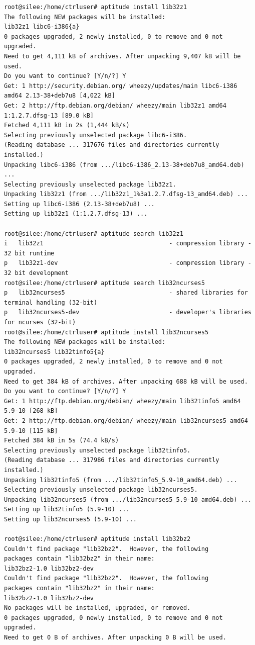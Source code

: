 \documentclass[11pt
  , a4paper
  , article
  , oneside
]{memoir}
\begin{document}
\begin{lstlisting}[style=termstyle]
root@silee:/home/ctrluser# aptitude install lib32z1
The following NEW packages will be installed:
lib32z1 libc6-i386{a} 
0 packages upgraded, 2 newly installed, 0 to remove and 0 not upgraded.
Need to get 4,111 kB of archives. After unpacking 9,407 kB will be used.
Do you want to continue? [Y/n/?] Y
Get: 1 http://security.debian.org/ wheezy/updates/main libc6-i386 amd64 2.13-38+deb7u8 [4,022 kB]
Get: 2 http://ftp.debian.org/debian/ wheezy/main lib32z1 amd64 1:1.2.7.dfsg-13 [89.0 kB]
Fetched 4,111 kB in 2s (1,444 kB/s)                                    
Selecting previously unselected package libc6-i386.
(Reading database ... 317676 files and directories currently installed.)
Unpacking libc6-i386 (from .../libc6-i386_2.13-38+deb7u8_amd64.deb) ...
Selecting previously unselected package lib32z1.
Unpacking lib32z1 (from .../lib32z1_1%3a1.2.7.dfsg-13_amd64.deb) ...
Setting up libc6-i386 (2.13-38+deb7u8) ...
Setting up lib32z1 (1:1.2.7.dfsg-13) ...

root@silee:/home/ctrluser# aptitude search lib32z1
i   lib32z1                                   - compression library - 32 bit runtime                               
p   lib32z1-dev                               - compression library - 32 bit development                           
root@silee:/home/ctrluser# aptitude search lib32ncurses5
p   lib32ncurses5                             - shared libraries for terminal handling (32-bit)                    
p   lib32ncurses5-dev                         - developer's libraries for ncurses (32-bit)                         
root@silee:/home/ctrluser# aptitude install lib32ncurses5
The following NEW packages will be installed:
lib32ncurses5 lib32tinfo5{a} 
0 packages upgraded, 2 newly installed, 0 to remove and 0 not upgraded.
Need to get 384 kB of archives. After unpacking 688 kB will be used.
Do you want to continue? [Y/n/?] Y
Get: 1 http://ftp.debian.org/debian/ wheezy/main lib32tinfo5 amd64 5.9-10 [268 kB]
Get: 2 http://ftp.debian.org/debian/ wheezy/main lib32ncurses5 amd64 5.9-10 [115 kB]
Fetched 384 kB in 5s (74.4 kB/s)        
Selecting previously unselected package lib32tinfo5.
(Reading database ... 317986 files and directories currently installed.)
Unpacking lib32tinfo5 (from .../lib32tinfo5_5.9-10_amd64.deb) ...
Selecting previously unselected package lib32ncurses5.
Unpacking lib32ncurses5 (from .../lib32ncurses5_5.9-10_amd64.deb) ...
Setting up lib32tinfo5 (5.9-10) ...
Setting up lib32ncurses5 (5.9-10) ...

root@silee:/home/ctrluser# aptitude install lib32bz2
Couldn't find package "lib32bz2".  However, the following
packages contain "lib32bz2" in their name:
lib32bz2-1.0 lib32bz2-dev 
Couldn't find package "lib32bz2".  However, the following
packages contain "lib32bz2" in their name:
lib32bz2-1.0 lib32bz2-dev 
No packages will be installed, upgraded, or removed.
0 packages upgraded, 0 newly installed, 0 to remove and 0 not upgraded.
Need to get 0 B of archives. After unpacking 0 B will be used.


\end{lstlisting}
\end{document}
